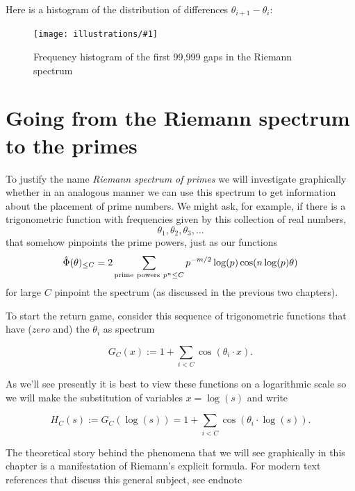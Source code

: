 \documentclass[openany]{book}
\newcommand{\ill}[3]{%
   \begin{figure}[H]%
   \vspace{-2ex}
   \centering%
   \texttt{[image: illustrations/\#1]}%
   \caption{#3}%
   \vspace{-2ex}
    \end{figure}}
\theoremstyle{plain}
\theoremstyle{definition}
\begin{document}
{{        Here is a histogram of the distribution of differences $\theta_{i+1}-\theta_i$:
\


\ill{riemann_spectrum_gaps}{0.95}{Frequency histogram of the
first 99{,}999 gaps in the Riemann spectrum\label{fig:riemann_spectrum_gaps}}

\chapter[From the Riemann spectrum to primes]{Going
from the Riemann spectrum to the primes}

To justify the name {\it Riemann spectrum of primes} we will
investigate graphically whether in an analogous manner we can use this
spectrum to get information about the placement of prime numbers. We
might ask, for example, if there is a trigonometric function with
frequencies given by this collection of real
numbers, $$\theta_1,\theta_2,\theta_3,\dots$$ that somehow pinpoints
the prime powers, just as our functions $${\hat \Phi}(\theta)_{\le C}=
2\sum_{{\rm prime\ powers\ } p^n \le C}
p^{-m/2}\log(p)\cos(n\log(p)\theta)$$ for large $C$ pinpoint the
spectrum (as discussed in the previous two chapters).

  To start the return game, consider this sequence of trigonometric functions that have ($zero$ and)  the $\theta_i$ as  spectrum

   $$G_C(x):= 1+ \sum_{i < C}\cos(\theta_i\cdot x).$$

    As we'll see  presently it is best to view these functions on a logarithmic scale so we will make the substitution of variables  $x = \log(s)$ and write

    $$H_C(s):= G_C(\log(s))= 1+ \sum_{i < C}\cos(\theta_i\cdot \log(s)).$$


   The theoretical story behind the phenomena that we will
     see graphically in this chapter is a manifestation of
     Riemann's explicit formula.  For modern text references that discuss this general subject, see endnote }}
\end{document}
